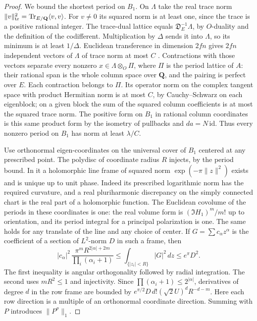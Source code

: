 \begin{proof}
We bound the shortest period on \(B_1\). On \(\Lambda\) take the
real trace norm \(\|v\|_{\rm tr}^2=
\operatorname{Tr}_{E/\mathbf Q}\langle v,v\rangle\).
For \(v\ne0\) its squared norm is at least one, since the trace
is a positive rational integer. The trace-dual lattice equals
\(\mathfrak D_E^{-1}\Lambda\), by \(O\)-duality and the definition
of the codifferent. Multiplication by \(\Delta\) sends it into
\(\Lambda\), so its minimum is at least \(1/\Delta\).
Euclidean transference in dimension \(2fn\) gives \(2fn\) independent
vectors of \(\Lambda\) of trace norm at most \(C\)
\cite[Theorem 2.1]{banaszczyk}. Contractions with those vectors
separate every nonzero \(x\in\Lambda\otimes_O\Pi\), where
\(\Pi\) is the period lattice of \(A\): their rational span is the
whole column space over \(\mathbf Q\), and the pairing is perfect
over \(E\). Each contraction belongs to \(\Pi\). Its operator norm
on the complex tangent space with product Hermitian norm is at
most \(C\), by Cauchy--Schwarz on each eigenblock; on a given block
the sum of the squared column coefficients is at most the squared
trace norm. The positive form on \(B_1\) in rational column
coordinates is this same product form by the isometry of pullbacks
and \(da=N\,\mathrm{id}\). Thus every nonzero period on \(B_1\)
has norm at least \(\lambda/C\).

Use orthonormal eigen-coordinates on the universal cover of \(B_1\)
centered at any prescribed point. The polydisc of coordinate radius
\(R\) injects, by the period bound. In it a holomorphic line frame
of squared norm \(\exp(-\pi\|z\|^2)\) exists and is unique up to
unit phase. Indeed its prescribed logarithmic norm has the required
curvature, and a real pluriharmonic discrepancy on the simply
connected chart is the real part of a holomorphic function.
The Euclidean covolume of the periods in these coordinates is one:
the real volume form is \((\Im H_1)^m/m!\) up to orientation,
and its period integral for a principal polarization is one.
The same holds for any translate of the line and any choice of
center. If \(G=\sum c_\alpha z^\alpha\) is the coefficient of a
section of \(L^2\)-norm \(D\) in such a frame, then
\[
 |c_\alpha|^2\,
 \frac{\pi^mR^{2|\alpha|+2m}}{\prod_i(\alpha_i+1)}
 \le \int_{\{|z_i|<R\}}|G|^2\,dz\le e^\pi D^2 .
\]
The first inequality is angular orthogonality followed by radial
integration. The second uses \(mR^2\le1\) and injectivity. Since
\(\prod(\alpha_i+1)\le2^{|\alpha|}\), derivatives of degree \(d\)
in the row frame are bounded by
\(e^{\pi/2}D\,d!(\sqrt2 U)^d R^{-d-m}\).
Here each row direction is a multiple of an orthonormal coordinate
direction. Summing with \(P\) introduces \(\|P^\sigma\|_1\).


\end{proof}
